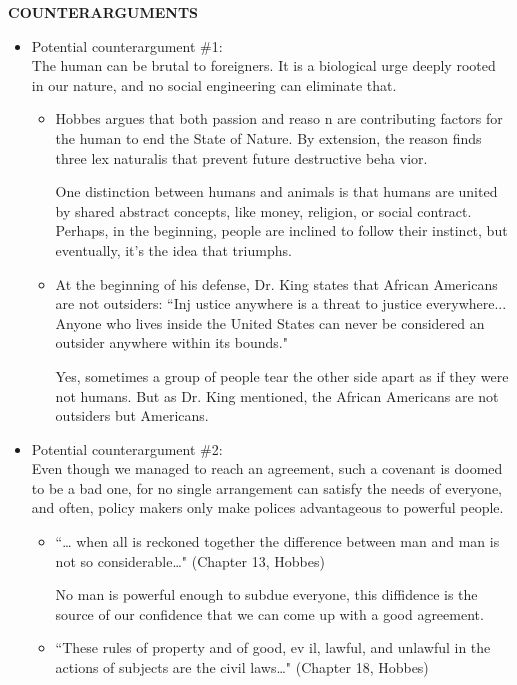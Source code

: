 \documentclass{article}
\begin{document}
\begin{paracol}{3}
	\switchcolumn[0]
	\noindent \textbf{COUNTERARGUMENTS}
	\switchcolumn[2]
\begin{itemize}
	\item Potential counterargument \#1:\\
		The human can be brutal to foreigners. It is a biological urge deeply rooted in our nature, and no social engineering can eliminate that.
		\begin{itemize}
			\item Hobbes argues that both passion and reaso
n are contributing factors for the human to end the State of Nature. By extension, the reason finds three      lex naturalis  that prevent future destructive beha   vior.

One distinction between humans and animals is that humans are united by shared abstract concepts, like money, religion, or social contract. Perhaps, in the beginning, people are inclined to follow their instinct, but eventually, it’s the idea that triumphs.
\item At the beginning of his defense, Dr. King
 states that African Americans are not outsiders: “Inj
ustice anywhere is a threat to justice everywhere... Anyone who lives inside the United States can never be considered an outsider anywhere within its bounds."

        Yes, sometimes a group of people tear the other side apart as if they were not humans. But as Dr. King mentioned, the African Americans are not outsiders but Americans.
		\end{itemize}
	\item Potential counterargument \#2:\\
		Even though we managed to reach an agreement, such a covenant is doomed to be a bad one, for no single arrangement can satisfy the needs of everyone, and often, policy makers only make polices advantageous to powerful people.
		\begin{itemize}
			\item “… when all is reckoned
together the difference between man and man is not so considerable…" (Chapter 13, Hobbes)

                No man is powerful enough to subdue everyone, this diffidence is the source of our confidence that we can come up with a good agreement.
	\item “These rules of property and of good, ev
il, lawful, and unlawful in the actions of subjects are the civil laws…" (Chapter 18, Hobbes)


\end{itemize}
\end{itemize}
\end{paracol}
\end{document}
